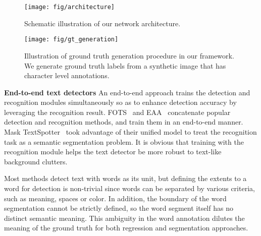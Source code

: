 \documentclass[10pt,twocolumn,letterpaper]{article}
\begin{document}
\begin{figure}[t!]
	\begin{center}
\texttt{[image: fig/architecture]}
         \vspace{+3mm}
        \caption{Schematic illustration of our network architecture.}
  	    \label{fig:architecture} 
    \end{center}
     \vspace{-7.5mm}
\end{figure}


\begin{figure*}[t!]
  \begin{center}
    \texttt{[image: fig/gt\_generation]}
    \vspace{+2mm}
    \caption{Illustration of ground truth generation procedure in our framework. We generate ground truth labels from a synthetic image that has character level annotations.}
  \label{fig:gtgeneration} 
  \end{center}
  \vspace{-3mm}
\end{figure*}

\vspace{2mm}
{\bf End-to-end text detectors } An end-to-end approach trains the detection and recognition modules simultaneously so as to enhance detection accuracy by leveraging the recognition result. FOTS~\cite{liu2018fots} and EAA~\cite{he2018end} concatenate popular detection and recognition methods, and train them in an end-to-end manner.
Mask TextSpotter~\cite{lyu2018mask} took advantage of their unified model to treat the recognition task as a semantic segmentation problem. 
It is obvious that training with the recognition module helps the text detector be more robust to text-like background clutters.


Most methods detect text with words as its unit, but defining the extents to a word for detection is non-trivial since words can be separated by various criteria, such as meaning, spaces or color. In addition, the boundary of the word segmentation cannot be strictly defined, so the word segment itself has no distinct semantic meaning. This ambiguity in the word annotation dilutes the meaning of the ground truth for both regression and segmentation approaches. 
\end{document}
